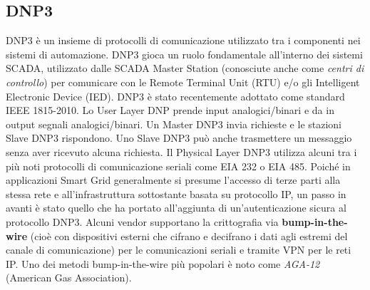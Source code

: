 \subsection{DNP3}
DNP3 è un insieme di protocolli di comunicazione utilizzato tra i componenti nei sistemi di automazione. DNP3 gioca un ruolo fondamentale all'interno dei sistemi SCADA, utilizzato dalle SCADA Master Station (conosciute anche come \emph{centri di controllo}) per comunicare con le Remote Terminal Unit (RTU) e/o gli Intelligent Electronic Device (IED). DNP3 è stato recentemente adottato come standard IEEE 1815-2010\cite{dnp}. Lo User Layer DNP prende input analogici/binari e da in output segnali analogici/binari. Un Master DNP3 invia richieste e le stazioni Slave DNP3 rispondono. Uno Slave DNP3 può anche trasmettere un messaggio senza aver ricevuto alcuna richiesta. Il Physical Layer DNP3 utilizza alcuni tra i più noti protocolli di comunicazione seriali come EIA 232 o EIA 485.
\newline\newline
Poiché in applicazioni Smart Grid generalmente si presume l'accesso di terze parti alla stessa rete e all'infrastruttura sottostante basata su protocollo IP, un passo in avanti è stato quello che ha portato all'aggiunta di un'autenticazione sicura al protocollo DNP3. Alcuni vendor supportano la crittografia via \textbf{bump-in-the-wire} (cioè con dispositivi esterni che cifrano e decifrano i dati agli estremi del canale di comunicazione) per le comunicazioni seriali e tramite VPN per le reti IP. Uno dei metodi bump-in-the-wire più popolari è noto come \emph{AGA-12} (American Gas Association).
